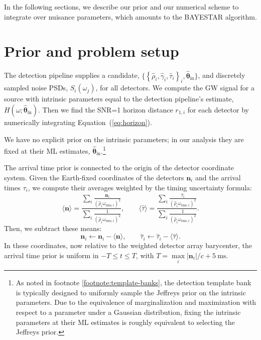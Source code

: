 \documentclass[amsmath,amssymb,aps,prx,reprint,nopreprintnumbers,nofootinbib,showpacs]{revtex4-1}
\begin{document}
In the following sections, we describe our prior and our numerical scheme to integrate over nuisance parameters, which amounts to the \ac{BAYESTAR} algorithm.

\section{Prior and problem setup}
\label{sec:prior}

The detection pipeline supplies a candidate, $\{\left\{ \hat\rho_i, \hat\gamma_i, \hat\tau_i \right\}_i, \hat{\bm\theta}_\mathrm{in}\}$, and discretely sampled noise \acp{PSD}, $S_i(\omega_j)$, for all detectors. We compute the \ac{GW} signal for a source with intrinsic parameters equal to the detection pipeline's estimate, $H(\omega; \hat{\bm\theta}_\mathrm{in})$.
Then we find the \ac{SNR}=1 horizon distance $r_{1,i}$ for each detector by numerically integrating Equation~(\ref{eq:horizon}).

We have no explicit prior on the intrinsic parameters; in our analysis they are fixed at their \ac{ML} estimates, $\hat{\bm\theta}_\mathrm{in}$.\footnote{As noted in footnote \ref{footnote:template-banks}, the detection template bank is typically designed to uniformly sample the Jeffreys prior on the intrinsic parameters. Due to the equivalence of marginalization and maximization with respect to a parameter under a Gaussian distribution, fixing the intrinsic parameters at their \ac{ML} estimates is roughly equivalent to selecting the Jeffreys prior.}

The arrival time prior is connected to the origin of the detector coordinate system. Given the Earth\nobreakdashes-fixed coordinates of the detectors $\mathbf{n}_i$ and the arrival times $\tau_i$, we compute their averages weighted by the timing uncertainty formula:
%
\begin{equation*}
    \langle \mathbf{n} \rangle = \frac{
        \displaystyle
        \sum_i \frac{\mathbf{n}_i}
            {\left(\hat\rho_i \omega_{\mathrm{rms},i}\right)^2}
    }{
        \displaystyle
        \sum_i \frac{1}{\left(\hat\rho_i \omega_{\mathrm{rms},i}\right)^2}
    },
    \qquad
    \langle \hat\tau \rangle = \frac{
        \displaystyle
        \sum_i \frac{\hat\tau_i}
            {\left(\hat\rho_i \omega_{\mathrm{rms},i}\right)^2}
    }{
        \displaystyle
        \sum_i \frac{1}{\left(\hat\rho_i \omega_{\mathrm{rms},i}\right)^2}
    }.
\end{equation*}
%
Then, we subtract these means:
%
\begin{equation*}
    \mathbf{n}_i \leftarrow \mathbf{n}_i - \langle \mathbf{n} \rangle,
    \qquad
    \hat\tau_i \leftarrow \hat\tau_i - \langle \hat\tau \rangle.
\end{equation*}
%
In these coordinates, now relative to the weighted detector array barycenter, the arrival time prior is uniform in $-T \leq t \leq T$, with $T = \max\limits_i |\mathbf{n}_i| / c + 5~\textrm{ms}$.
\end{document}
